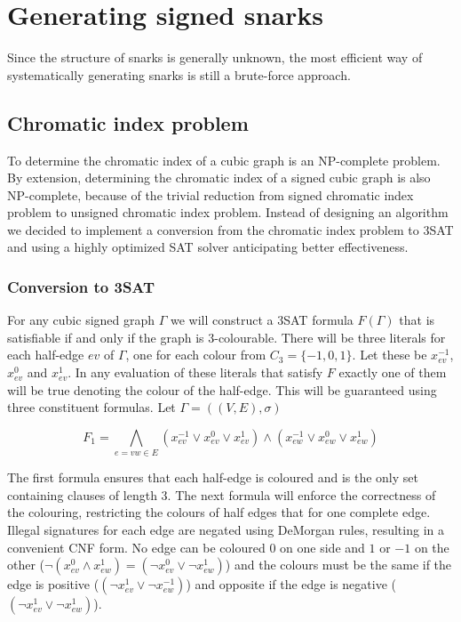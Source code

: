 \chapter{Generating signed snarks}

Since the structure of snarks is generally unknown, the most efficient way of systematically generating snarks is still a brute-force approach.

\section{Chromatic index problem}

To determine the chromatic index of a cubic graph is an NP-complete problem. By extension, determining the chromatic index of a signed cubic graph is also NP-complete, because of the trivial reduction from signed chromatic index problem to unsigned chromatic index problem. Instead of designing an algorithm we decided to implement a conversion from the chromatic index problem to 3SAT and using a highly optimized SAT solver anticipating better effectiveness.

\subsection{Conversion to 3SAT}

For any cubic signed graph $\Gamma$ we will construct a 3SAT formula $F(\Gamma)$ that is satisfiable if and only if the graph is 3-colourable. There will be three literals for each half-edge $ev$ of $\Gamma$, one for each colour from $C_3 = \{-1, 0, 1\}$. Let these be $x^{-1}_{ev}$, $x^{0}_{ev}$ and $x^{1}_{ev}$. In any evaluation of these literals that satisfy $F$ exactly one of them will be true denoting the colour of the half-edge. This will be guaranteed using three constituent formulas. Let $\Gamma = ((V, E), \sigma)$

$$F_1 = \bigwedge _{e = vw \in E} (x^{-1}_{ev} \vee x^{0}_{ev} \vee x^{1}_{ev}) \wedge (x^{-1}_{ew} \vee x^{0}_{ew} \vee x^{1}_{ew}) $$

The first formula ensures that each half-edge is coloured and is the only set containing clauses of length 3. The next formula will enforce the correctness of the colouring, restricting the colours of half edges that for one complete edge. Illegal signatures for each edge are negated using DeMorgan rules, resulting in a convenient CNF form. No edge can be coloured $0$ on one side and $1$ or $-1$ on the other ($\neg (x^{0}_{ev} \land x^{1}_{ew}) = (\neg x^{0}_{ev} \lor \neg x^{1}_{ew})$) and the colours must be the same if the edge is positive ($(\neg x^{1}_{ev} \lor \neg x^{-1}_{ew})$) and opposite if the edge is negative ($(\neg x^{1}_{ev} \lor \neg x^{1}_{ew})$).

